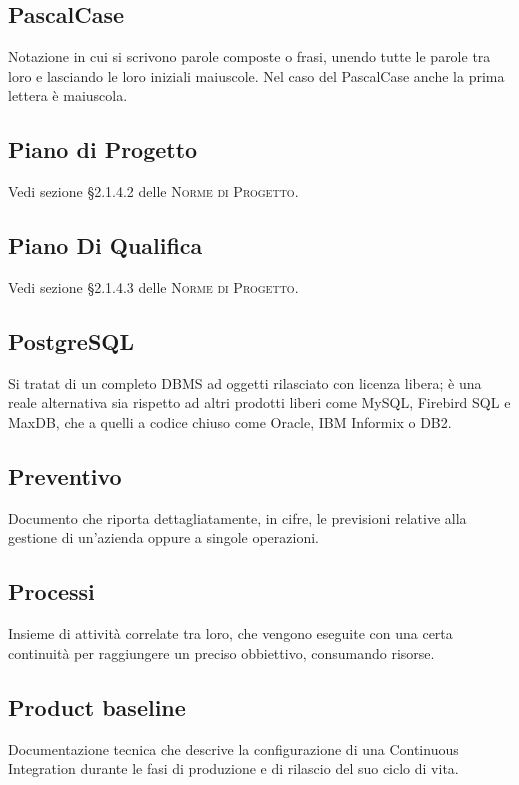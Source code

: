 \documentclass[../glossario.tex]{subfiles}
\begin{document}
\subsection*{PascalCase}
{}
Notazione in cui si scrivono parole composte o frasi, unendo tutte le parole tra loro e lasciando le loro iniziali maiuscole. Nel caso del PascalCase anche la prima lettera è maiuscola.

\subsection*{Piano di Progetto}
{}
Vedi sezione \S2.1.4.2 delle \textsc{Norme di Progetto}.

\subsection*{Piano Di Qualifica}
{}
Vedi sezione \S2.1.4.3 delle \textsc{Norme di Progetto}.

\subsection*{PostgreSQL}
{}
Si tratat di un completo DBMS ad oggetti rilasciato con licenza libera; è una reale alternativa sia rispetto ad altri prodotti liberi come MySQL, Firebird SQL e MaxDB, che a quelli a codice chiuso come Oracle, IBM Informix o DB2.

\subsection*{Preventivo}
{}
Documento che riporta dettagliatamente, in cifre, le previsioni relative alla gestione di un'azienda oppure a singole operazioni.

\subsection*{Processi}
{}
Insieme di attività correlate tra loro, che vengono eseguite con una certa continuità per raggiungere un preciso obbiettivo, consumando risorse.

\subsection*{Product baseline}
{}
Documentazione tecnica che descrive la configurazione di una Continuous Integration durante le fasi di produzione e di rilascio del suo ciclo di vita.
\end{document}
